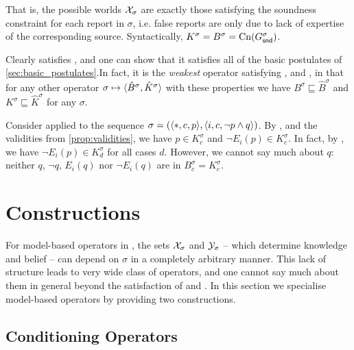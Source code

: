 That is, the possible worlds $\mathcal{X}_\sigma$ are
exactly those satisfying the soundness constraint for each report in
$\sigma$, i.e. false reports are only due to lack of expertise of the
corresponding source.
%
Syntactically, $K^\sigma = B^\sigma = \operatorname{Cn}(G^\sigma_{\mathsf{snd}})$.

Clearly \weakop{} satisfies \soundness{}, and one
can show that it satisfies all of the basic postulates of
\cref{sec:basic_postulates}.\footnotemark In fact, it is the \emph{weakest}
operator satisfying \closure{}, \containment{} and \soundness{}, in that
for any other operator $\sigma \mapsto \langle {\hat{B}^\sigma,
\hat{K}^\sigma} \rangle$ with these properties we have $B^\sigma \sqsubseteq
\hat{B}^\sigma$ and $K^\sigma \sqsubseteq \hat{K}^\sigma$ for any $\sigma$.

\begin{example}
\label{ex:model_based}
    Consider \weakop{} applied to the sequence
    $
        \sigma
        = (\langle {\ast, c, p} \rangle, \langle {i, c, \neg p \land q} \rangle)
    $.
    By \soundness{}, \closure{} and the validities from \cref{prop:validities},
    we have $p \in K^\sigma_c$ and $\neg E_i(p) \in K^\sigma_c$. In fact, by
    \closure{}, we
    have $\neg E_i(p) \in K^\sigma_d$ for all cases $d$.
    However, we cannot say much about $q$: neither $q$, $\neg q$, $E_i(q)$ nor
    $\neg E_i(q)$ are in $B^\sigma_c = K^\sigma_c$.

\end{example}

\section{Constructions}
\label{sec:constructions}

For model-based operators in , the sets $\mathcal{X}_\sigma$ and
$\mathcal{Y}_\sigma$ -- which determine knowledge and belief -- can
depend on $\sigma$ in a completely arbitrary manner. This lack of structure
leads to very wide class of operators, and one cannot say much about them in
general beyond the satisfaction of \closure{} and \containment{}. In this
section we specialise model-based operators by providing two constructions.

\subsection{Conditioning Operators}
\label{sec:conditioning_operators}

